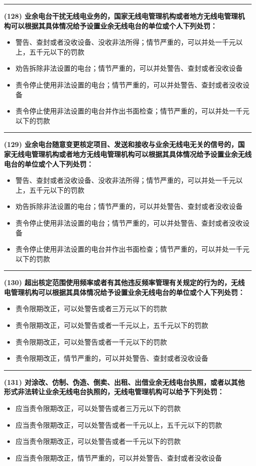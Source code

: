 \documentclass[twocolumn]{ctexart}  %
\begin{document}
\noindent\rule{0.5\textwidth}{1pt}
\heiti \textbf{(128) 业余电台干扰无线电业务的，国家无线电管理机构或者地方无线电管理机构可以根据其具体情况给予设置业余无线电台的单位或个人下列处罚：} \songti {\color{gray} [LK0095] }
\begin{itemize}
	\item  警告、查封或者没收设备、没收非法所得；情节严重的，可以并处一千元以上，五千元以下的罚款
	\item  劝告拆除非法设置的电台；情节严重的，可以并处警告、查封或者没收设备
	\item  责令停止使用非法设置的电台；情节严重的，可以并处警告、查封或者没收设备
	\item  责令停止使用非法设置的电台并作出书面检查；情节严重的，可以并处一千元以下的罚款
\end{itemize}


\noindent\rule{0.5\textwidth}{1pt}
\heiti \textbf{(129) 业余电台随意变更核定项目、发送和接收与业余无线电无关的信号的，国家无线电管理机构或者地方无线电管理机构可以根据其具体情况给予设置业余无线电台的单位或个人下列处罚：} \songti {\color{gray} [LK0096] }
\begin{itemize}
	\item  警告、查封或者没收设备、没收非法所得；情节严重的，可以并处一千元以上，五千元以下的罚款
	\item  劝告拆除非法设置的电台；情节严重的，可以并处警告、查封或者没收设备
	\item  责令停止使用非法设置的电台；情节严重的，可以并处警告、查封或者没收设备
	\item  责令停止使用非法设置的电台并作出书面检查；情节严重的，可以并处一千元以下的罚款
\end{itemize}


\noindent\rule{0.5\textwidth}{1pt}
\heiti \textbf{(130) 超出核定范围使用频率或者有其他违反频率管理有关规定的行为的，无线电管理机构可以根据其具体情况给予设置业余无线电台的单位或个人下列处罚：} \songti {\color{gray} [LK0097] }
\begin{itemize}
	\item  责令限期改正，可以处警告或者三万元以下的罚款
	\item  责令限期改正，可以处警告或者一千元以上，五千元以下的罚款
	\item  责令限期改正，可以处警告或者一千元以下的罚款
	\item  责令限期改正，情节严重的，可以并处警告、查封或者没收设备
\end{itemize}


\noindent\rule{0.5\textwidth}{1pt}
\heiti \textbf{(131) 对涂改、仿制、伪造、倒卖、出租、出借业余无线电台执照，或者以其他形式非法转让业余无线电台执照的，无线电管理机构可以给予下列处罚：} \songti {\color{gray} [LK0098] }
\begin{itemize}
	\item  应当责令限期改正，可以处警告或者三万元以下的罚款
	\item  应当责令限期改正，可以处警告或者一千元以上，五千元以下的罚款
	\item  应当责令限期改正，可以处警告或者一千元以下的罚款
	\item  应当责令限期改正，情节严重的，可以并处警告、查封或者没收设备
\end{itemize}
\end{document}

